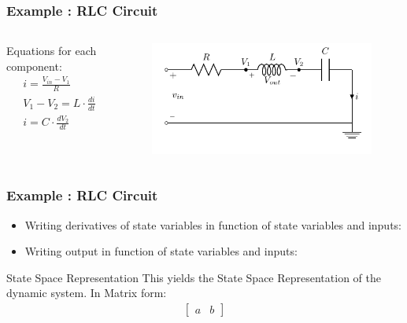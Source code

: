 \begin{frame}
	\frametitle{Example : RLC Circuit}
	
	\begin{columns}
		\begin{column}{0.4\linewidth}
			Equations for each component:
			\begin{align*}
			&i = \frac{V_{in} - V_{1}}{R} \\
			&V_1 - V_2 = L \cdot \frac{di}{dt} \\
			&i = C \cdot \frac{dV_2}{dt} \\
			\end{align*}
		\end{column}
		\begin{column}{0.6\linewidth}
			\begin{figure}
				\centering
				\includegraphics[width=1\linewidth]{img/circuit-RLC}
				\label{fig:circuit-RLC-small}
			\end{figure}
		\end{column}
		
	\end{columns}
	
\end{frame}
\begin{frame}
	\frametitle{Example : RLC Circuit}
	\begin{itemize}
		\item Writing derivatives of state variables in function of state variables and inputs:
		
		\item Writing output in function of state variables and inputs:
	\end{itemize}
	\begin{block}{State Space Representation}
		This yields the State Space Representation of the dynamic system. In Matrix form:
		\begin{align*}
			\begin{bmatrix}
			a & b 
			\end{bmatrix}
		\end{align*}
	\end{block}
			
\end{frame}
